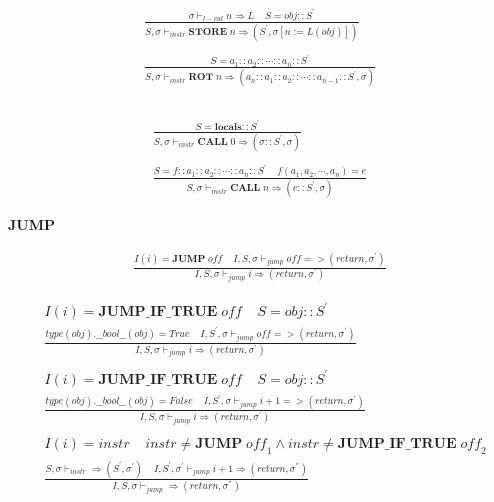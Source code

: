 \documentclass[12pt, a4paper]{report}
\newcommand{\ddfrac}[3]{
    & #1 \\
    & \frac { #2 } { #3 }
}
\newcommand{\rulegroup}[1]{
    \textbf{#1}
}
\newcommand{\gap}{ \;\;\;\; }
\begin{document}
\begin{equation*}
\begin{split}
\frac{ \sigma \vdash_{l-val} n \Rightarrow L \;\;\;\; S = obj::S^{'}}
     { S, \sigma \vdash_{instr} \mathbf{STORE} \; n \Rightarrow (S^{'}, \sigma[n := L(obj)])}
\\
\\
\frac{
    S = a_1 :: a_2 :: \cdots :: a_n :: S^{'}
}{
    S, \sigma \vdash_{instr} \mathbf{ROT}\;n 
    \Rightarrow
    (a_n :: a_1 :: a_2 :: \cdots :: a_{n - 1} :: S^{'}, \sigma)
}
\\
\\
\end{split}
\end{equation*}

\begin{equation*}
\begin{split}
\frac{
    S = \mathbf{locals} :: S^{'}
}{
    S, \sigma \vdash_{instr} \mathbf{CALL}\;0 \Rightarrow (\sigma::S^{'}, \sigma)
}
\\
\\
\frac{
    S = f :: a_1 :: a_2 :: \cdots :: a_n :: S^{'}
    \gap
    f(a_1, a_2, \cdots, a_n) = e
}{
    S, \sigma \vdash_{instr} \mathbf{CALL}\;n \Rightarrow (e::S^{'}, \sigma)
}
\end{split}
\end{equation*}

\hrulefill

\rulegroup{JUMP}

\begin{equation*}
\begin{split}
\frac{ I(i) = \mathbf{JUMP} \; \mathit{off} \;\;\;\; I, S, \sigma \vdash_{jump} \mathit{off} => (return, \sigma^{'})}
     { I, S, \sigma \vdash_{jump} i \Rightarrow (return, \sigma^{'})}
\end{split}
\end{equation*}

\begin{equation*}
\begin{split}
\ddfrac{
    I(i) = \mathbf{JUMP\_IF\_TRUE} \; \mathit{off}
    \gap
    S = obj :: S^{'}
}{
     type(obj).\_\_bool\_\_(obj) = True
     \gap
    I, S^{'}, \sigma \vdash_{jump} \mathit{off} => (return, \sigma^{'})
}{ I, S, \sigma \vdash_{jump} i \Rightarrow (return, \sigma^{'}) }
\\ \\
\ddfrac{
    I(i) = \mathbf{JUMP\_IF\_TRUE} \; \mathit{off}
    \gap
    S = obj :: S^{'}
}{
    type(obj).\_\_bool\_\_(obj) = False
    \gap
    I, S^{'}, \sigma \vdash_{jump} \mathit{i}+1 => (return, \sigma^{'})
}{ I, S, \sigma \vdash_{jump} i \Rightarrow (return, \sigma^{'})}
\\ \\
\ddfrac{
    I(i) = \mathit{instr}
    \gap
    \mathit{instr} \ne \mathbf{JUMP} \;\mathit{off}_1
        \wedge
    \mathit{instr} \ne \mathbf{JUMP\_IF\_TRUE} \;\mathit{off}_2
}{
    S, \sigma \vdash_{instr} \Rightarrow (S^{'}, \sigma^{'})
    \gap
    I, S^{'}, \sigma^{'} \vdash_{jump} i + 1 \Rightarrow (return, \sigma^{''})
}{
    I, S, \sigma \vdash_{jump} \Rightarrow (return, \sigma^{''})
}
\end{split}
\end{equation*}

\hrulefill

% 
\end{document}
